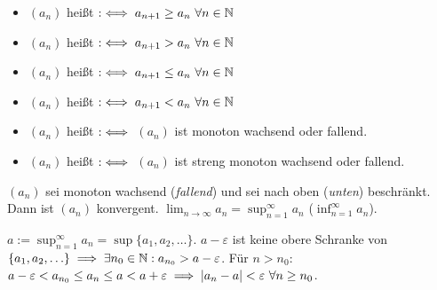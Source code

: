 \documentclass[a4paper,oneside,DIV15,BCOR12mm]{scrbook}
\begin{document}
\begin{definition}[Monotonie]
\begin{itemize}
\item $(a_n)$ heißt  $:\iff a_{n+1} \ge a_n \ \forall n\in\mathbb{N}$
\item $(a_n)$ heißt  $:\iff a_{n+1} > a_n \ \forall n\in\mathbb{N}$
\item $(a_n)$ heißt  $:\iff a_{n+1} \le a_n \ \forall n\in\mathbb{N}$
\item $(a_n)$ heißt  $:\iff a_{n+1} < a_n \ \forall n\in\mathbb{N}$
\item $(a_n)$ heißt  $:\iff$ $(a_n)$ ist monoton wachsend oder fallend.
\item $(a_n)$ heißt  $:\iff$ $(a_n)$ ist streng monoton wachsend oder fallend.
\end{itemize}
\end{definition}

\begin{satz}[Monotoniekriterium]
$(a_n)$ sei monoton wachsend (\textit{fallend}) und sei nach oben (\textit{unten}) beschränkt. Dann ist $(a_n)$ konvergent. $\displaystyle\lim_{n\to\infty}a_n = \mathop{\sup}_{n=1}^\infty a_n$ ($\displaystyle\mathop{\inf}_{n=1}^\infty a_n$).
\end{satz}

\begin{beweis}
$a := \displaystyle\mathop{\sup}_{n=1}^\infty a_n = \sup\{a_1,a_2,\ldots\}$. $a-\varepsilon$ ist keine obere Schranke von $\{a_1, a_2,\ldots\} \implies \exists n_0 \in\mathbb{N}: a_{n_0} > a-\varepsilon$. Für $n>n_0$: $a-\varepsilon < a_{n_0} \le a_n \le a < a + \varepsilon \implies |a_n-a|<\varepsilon \ \forall n \ge n_0$.
\end{beweis}
\end{document}
